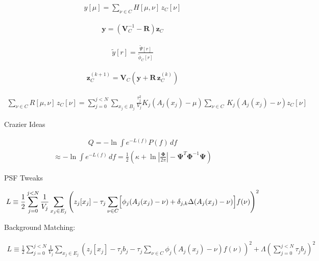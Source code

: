 \documentclass{amsart}
\begin{document}
\begin{align}
y[\mu]
=
\sum_{\nu \in C}
H[\mu,\nu]
\,
z_C[\nu]
\end{align}

\begin{align}
\mathbf{y}
= (\mathbf{V}_C^{-1} - \mathbf{R})
\mathbf{z}_C
\end{align}

\begin{align}
\widetilde{y}[r]
=
\frac{\widetilde{\Psi}[r]}{\widetilde{\phi}_C[r]}
\end{align}

\begin{align}
\mathbf{z}_C^{(k+1)}
=\mathbf{V}_C \left(
    \mathbf{y}
  + \mathbf{R}
  \,\mathbf{z}_C^{(k)}\right)
\end{align}

\begin{align}
\sum_{\nu \in C}
R[\mu,\nu] \, z_C[\nu]
=
\sum_{j=0}^{j<N}
\sum_{x_j \in {B}_j}
\frac{\tau_j^2}{V_j}
K_{j}\!\left( A_j(x_j) - \mu \right)
\sum_{\nu \in C}
\,
K_{j}\!\left( A_j(x_j) - \nu \right)
z_C[\nu]
\end{align}

Crazier Ideas

\begin{align}
Q = -\ln \! \int e^{-L(f)}  P(f) \, df
\end{align}
\begin{align}
\approx -\ln \! \int e^{-L(f)} \, df
= \frac{1}{2}\left(
    \kappa
  + \ln\left| \frac{\mathbf{\Phi}}{2\pi} \right|
  - \mathbf{\Psi}^T
    \mathbf{\Phi}^{-1}
    \mathbf{\Psi}
\right)
\end{align}

PSF Tweaks

\begin{align}
L \equiv
\frac{1}{2} \sum_{j=0}^{j<N}
\frac{1}{V_j}
\sum_{x_j \in {E}_j}
\left(
    z_j[x_j]
  - \tau_{j}
    \sum_{\nu \in C}
    \Bigl[
    \phi_{j}\!\left(
        A_j(x_j) - \nu
    \right)
    +\delta_{j,k}\Delta(A_j(x_j) - \nu)
    \Bigr]
    f(\nu)
\right)^2
\end{align}

Background Matching:

\begin{align}
L \equiv
\frac{1}{2} \sum_{j=0}^{j<N}
\frac{1}{V_j}
\sum_{x_j \in {E}_j}
\left(
    z_j[x_j]
  - \tau_{j}
    b_j
  - \tau_{j}
    \sum_{\nu \in C}
    \phi_{j}\!\left(
        A_j(x_j) - \nu
    \right)
    f(\nu)
\right)^2
+ \Lambda\left(\sum_{j=0}^{j<N}\tau_j b_j\right)^2
\end{align}
\end{document}
